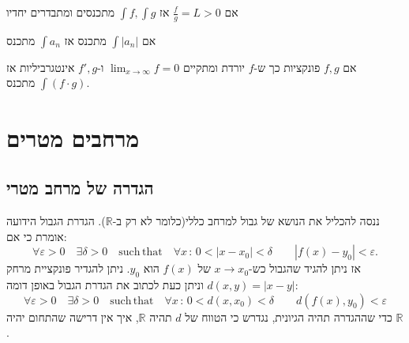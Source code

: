 \documentclass{tstextbook}
\begin{document}
\begin{proposition}
אם \(\frac{f}{g} = L > 0\) אז \(\int f, \int g\) מתכנסים ומתבדרים יחדיו

\end{proposition}
\begin{definition}
אם \(\int |a_n|\) מתכנס אז \(\int a_n\) מתכנס

\end{definition}
\begin{proposition}
אם \(f,g\) פונקציות כך ש-\(f\) יורדת ומתקיים \(\lim_{x\rightarrow \infty} f = 0\) ו-\(f', g\) אינטגרביליות אז \(\int (f\cdot g)\) מתכנס.

\end{proposition}
\begin{proposition}
\end{proposition}
\chapter{מרחבים מטרים}

\section{הגדרה של מרחב מטרי}

ננסה להכליל את הנושא של גבול למרחב כללי(כלומר לא רק ב-\(\mathbb{R}\)). הגדרת הגבול הידועה אומרת כי אם:
$$\forall\varepsilon>0\quad\exists\delta>0\quad\mathrm{such\,that}\quad\forall x\,:\,0<\left|x-x_{0}\right|<\delta\qquad\left|f(x)-y_{0}\right|<\varepsilon.$$
אז ניתן להגיד שהגבול כש-\(x\to x_{0}\)  של \(f(x)\) הוא \(y_{0}\). ניתן להגדיר פונקציית מרחק \(d(x,y)=|x-y|\) וניתן כעת לכתוב את הגדרת הגבול באופן דומה:
$$\forall\varepsilon>0\quad\exists\delta>0\quad\mathrm{such\,that}\quad\forall x\,:\,0<d(x,x_{0})<\delta\qquad d(f(x),y_{0})<\varepsilon$$
כדי שההגדרה תהיה הגיונית, נגדרש כי הטווח של \(d\) תהיה \(\mathbb{R}\), איך אין דרישה שהתחום יהיה \(\mathbb{R}\).
\end{document}
